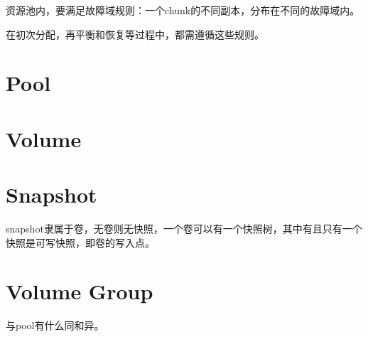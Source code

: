 资源池内，要满足故障域规则：一个chunk的不同副本，分布在不同的故障域内。\label{rule:faultset}

在初次分配，再平衡和恢复等过程中，都需遵循这些规则。

\section{Pool}

\section{Volume}

\section{Snapshot}

snapshot隶属于卷，无卷则无快照，一个卷可以有一个快照树，其中有且只有一个快照是可写快照，即卷的写入点。

\section{Volume Group}

与pool有什么同和异。
